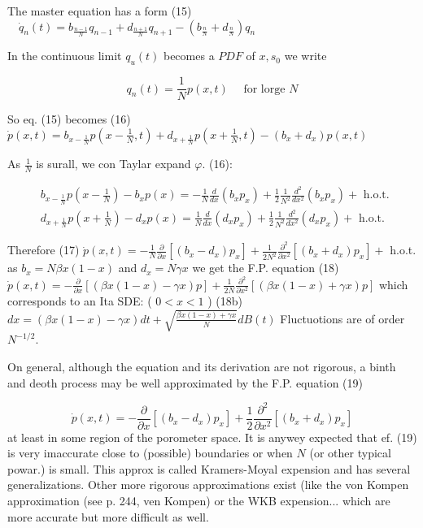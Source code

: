 The master equation has a form
(15) $\quad \dot{q}_{n}(t)=b_{\frac{n-1}{N}} q_{n-1}+d_{\frac{n+1}{N}} q_{n+1}-\left(b_{\frac{n}{N}}+d_{\frac{n}{N}}\right) q_{n}$

In the continuous limit $q_{u}(t)$ becomes a $P D F$ of $x, s_{0}$ we write

$$ q_{n}(t)=\frac{1}{N} p(x, t) \quad \text { for lorge } N $$ 

So eq. (15) becomes
(16)
$\dot{p}(x, t)=b_{x-\frac{1}{N}} p\left(x-\frac{1}{N}, t\right)+d_{x+\frac{1}{N}} p\left(x+\frac{1}{N}, t\right)-\left(b_{x}+d_{x}\right) p(x, t)$

As $\frac{1}{N}$ is surall, we con Taylar expand $\varphi$. (16):

$$ 
\begin{aligned}
& b_{x-\frac{1}{N}} p\left(x-\frac{1}{N}\right)-b_{x} p(x)=-\frac{1}{N} \frac{d}{d x}\left(b_{x} p_{x}\right)+\frac{1}{2} \frac{1}{N^{2}} \frac{d^{2}}{d x^{2}}\left(b_{x} p_{x}\right)+\text { h.o.t. } \\
& d_{x+\frac{1}{N}} p\left(x+\frac{1}{N}\right)-d_{x} p(x)=\frac{1}{N} \frac{d}{d x}\left(d_{x} p_{x}\right)+\frac{1}{2} \frac{1}{N^{2}} \frac{d^{2}}{d x^{2}}\left(d_{x} p_{x}\right)+\text { h.o.t. }
\end{aligned}
$$ 

Therefore
(17) $\dot{p}(x, t)=-\frac{1}{N} \frac{\partial}{\partial x}\left[\left(b_{x}-d_{x}\right) p_{x}\right]+\frac{1}{2 N^{2}} \frac{\partial^{2}}{\partial x^{2}}\left[\left(b_{x}+d_{x}\right) p_{x}\right]+$ h.o.t. as $b_{x}=N \beta x(1-x)$ and $d_{x}=N \gamma x$ we get the F.P. equation
(18) $\dot{p}(x, t)=-\frac{\partial}{\partial x}[(\beta x(1-x)-\gamma x) p]+\frac{1}{2 N} \frac{\partial^{2}}{\partial x^{2}}[(\beta x(1-x)+\gamma x) p]$
which corresponds to an Ita SDE: ( $0<x<1$ )
(18b) $d x=(\beta x(1-x)-\gamma x) d t+\sqrt{\frac{\beta x(1-x)+\gamma x}{N}} d B(t)$
Fluctuotions are of order $N^{-1 / 2}$.

On general, although the equation and its derivation are not rigorous, a binth and deoth process may be well approximated by the F.P. equation
(19)

$$ 
\dot{p}(x, t)=-\frac{\partial}{\partial x}\left[\left(b_{x}-d_{x}\right) p_{x}\right]+\frac{1}{2} \frac{\partial^{2}}{\partial x^{2}}\left[\left(b_{x}+d_{x}\right) p_{x}\right]
$$ 
at least in some region of the porometer space. It is anywey expected that ef. (19) is very imaccurate close to (possible) boundaries or when $N$ (or other typical powar.) is small. This approx is called Kramers-Moyal expension and has several generalizations. Other more rigorous approximations exist (like the von Kompen approximation (see p. 244, ven Kompen) or the WKB expension... which are more accurate but more difficult as well.

